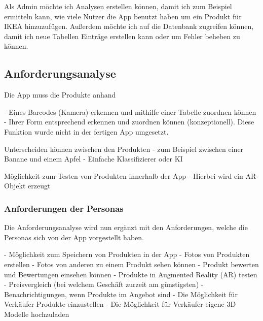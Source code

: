 \documentclass{scrartcl}
\begin{document}
Als Admin möchte ich Analysen erstellen können, damit ich zum Beispiel ermitteln kann, wie viele Nutzer die App benutzt haben um ein Produkt für IKEA hinzuzufügen.
Außerdem möchte ich auf die Datenbank zugreifen können, damit ich neue Tabellen Einträge erstellen kann oder um Fehler beheben zu können. \newline 

\subsection{Anforderungsanalyse}

\noindent Die App muss die Produkte anhand \newline 

\noindent - Eines Barcodes (Kamera) erkennen und mithilfe einer Tabelle zuordnen können \newline 
\noindent - Ihrer Form entsprechend erkennen und zuordnen können (konzeptionell). Diese Funktion wurde nicht in der fertigen App umgesetzt. \newline 

\noindent Unterscheiden können zwischen den Produkten \newline
\noindent - zum Beispiel zwischen einer Banane und einem Apfel \newline 
\noindent - Einfache Klassifizierer oder KI \newline

\noindent Möglichkeit zum Testen von Produkten innerhalb der App  \newline 
\noindent - Hierbei wird ein AR-Objekt erzeugt \newline

\subsubsection{Anforderungen der Personas}

Die Anforderungsanalyse wird nun ergänzt mit den Anforderungen, welche die Personas sich von der App vorgestellt haben. \newline 

\noindent - Möglichkeit zum Speichern von Produkten in der App \newline 
\noindent - Fotos von Produkten erstellen \newline 
\noindent - Fotos von anderen zu einem Produkt sehen können \newline 
\noindent - Produkt bewerten und Bewertungen einsehen können \newline 
\noindent - Produkte in Augmented Reality (AR) testen \newline 
\noindent - Preisvergleich (bei welchem Geschäft zurzeit am günstigsten)\newline 
\noindent - Benachrichtigungen, wenn Produkte im Angebot sind \newline
\noindent - Die Möglichkeit für Verkäufer Produkte einzustellen \newline 
\noindent - Die Möglichkeit für Verkäufer eigene 3D Modelle hochzuladen \newline
\end{document}
